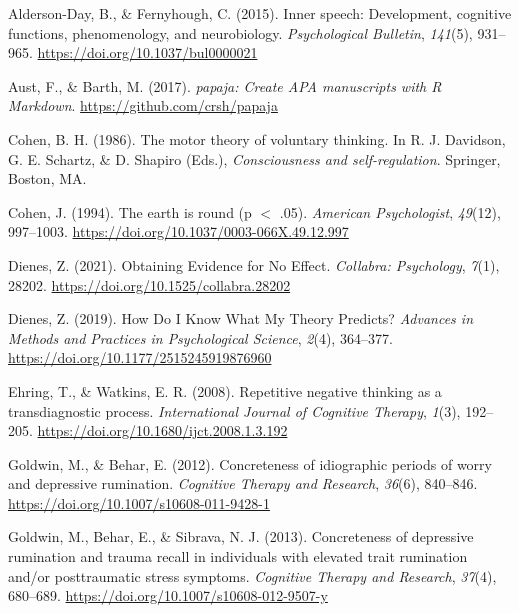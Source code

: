 \documentclass[
  english,
  man, donotrepeattitle,floatsintext]{apa6}
\newlength{\cslhangindent}
\newlength{\cslentryspacingunit} %
\newenvironment{CSLReferences}[2] %
 {%
  \setlength{\parindent}{0pt}
  \ifodd #1
  \let\oldpar\par
  \def\par{\hangindent=\cslhangindent\oldpar}
  \fi
  \setlength{\parskip}{#2\cslentryspacingunit}
 }%
 {}
\begin{document}
\hypertarget{refs}{}
\begin{CSLReferences}{1}{0}
\leavevmode{}%
Alderson-Day, B., \& Fernyhough, C. (2015). Inner speech: Development, cognitive functions, phenomenology, and neurobiology. \emph{Psychological Bulletin}, \emph{141}(5), 931--965. \url{https://doi.org/10.1037/bul0000021}

\leavevmode{}%
Aust, F., \& Barth, M. (2017). \emph{{papaja}: {Create} {APA} manuscripts with {R Markdown}}. \url{https://github.com/crsh/papaja}

\leavevmode{}%
Cohen, B. H. (1986). The motor theory of voluntary thinking. In R. J. Davidson, G. E. Schartz, \& D. Shapiro (Eds.), \emph{Consciousness and self-regulation}. {Springer, Boston, MA}.

\leavevmode{}%
Cohen, J. (1994). The earth is round (p {\(<\)} .05). \emph{American Psychologist}, \emph{49}(12), 997--1003. \url{https://doi.org/10.1037/0003-066X.49.12.997}

\leavevmode{}%
Dienes, Z. (2021). Obtaining {Evidence} for {No Effect}. \emph{Collabra: Psychology}, \emph{7}(1), 28202. \url{https://doi.org/10.1525/collabra.28202}

\leavevmode{}%
Dienes, Z. (2019). How {Do I Know What My Theory Predicts}? \emph{Advances in Methods and Practices in Psychological Science}, \emph{2}(4), 364--377. \url{https://doi.org/10.1177/2515245919876960}

\leavevmode{}%
Ehring, T., \& Watkins, E. R. (2008). Repetitive negative thinking as a transdiagnostic process. \emph{International Journal of Cognitive Therapy}, \emph{1}(3), 192--205. \url{https://doi.org/10.1680/ijct.2008.1.3.192}

\leavevmode{}%
Goldwin, M., \& Behar, E. (2012). Concreteness of idiographic periods of worry and depressive rumination. \emph{Cognitive Therapy and Research}, \emph{36}(6), 840--846. \url{https://doi.org/10.1007/s10608-011-9428-1}

\leavevmode{}%
Goldwin, M., Behar, E., \& Sibrava, N. J. (2013). Concreteness of depressive rumination and trauma recall in individuals with elevated trait rumination and/or posttraumatic stress symptoms. \emph{Cognitive Therapy and Research}, \emph{37}(4), 680--689. \url{https://doi.org/10.1007/s10608-012-9507-y}


\end{CSLReferences}
\end{document}
